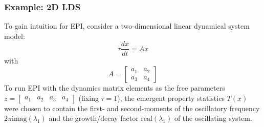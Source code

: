 \documentclass[11pt]{article}
\begin{document}

\subsubsection{Example: 2D LDS}\label{methods_2DLDS}
To gain intuition for EPI, consider a two-dimensional linear dynamical system model:
\begin{equation} 
\tau \frac{dx}{dt} = Ax
\end{equation}
with
\begin{equation}
A = \begin{bmatrix} a_1 & a_2 \\ a_3 & a_4 \end{bmatrix}
\end{equation}
To run EPI with the dynamics matrix elements as the free parameters $z = \begin{bmatrix} a_1 & a_2 & a_3 & a_4 \end{bmatrix}$ (fixing $\tau=1$), the emergent property statistics $T(x)$ were chosen to contain the first- and second-moments of the oscillatory frequency $2 \pi \text{imag}(\lambda_1)$ and the growth/decay factor $\text{real}(\lambda_1)$ of the oscillating system. 
\end{document}
